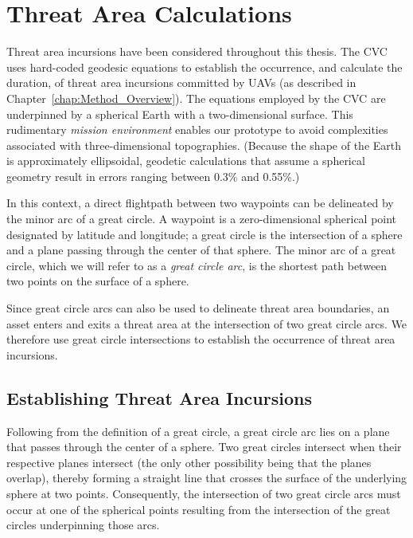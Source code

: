 \chapter{Threat Area Calculations}
\label{chap:Threat_Area_Calculations}

Threat area incursions have been considered throughout this thesis. The CVC uses hard-coded geodesic equations to establish the occurrence, and calculate the duration, of threat area incursions committed by UAVs (as described in Chapter~\ref{chap:Method_Overview}). The equations employed by the CVC are underpinned by a spherical Earth with a two-dimensional surface. This rudimentary \emph{mission environment} enables our prototype to avoid complexities associated with three-dimensional topographies. (Because the shape of the Earth is approximately ellipsoidal, geodetic calculations that assume a spherical geometry result in errors ranging between 0.3\% and 0.55\%.)

In this context, a direct flightpath between two waypoints can be delineated by the minor arc of a great circle. A waypoint is a zero-dimensional spherical point designated by latitude and longitude; a great circle is the intersection of a sphere and a plane passing through the center of that sphere. The minor arc of a great circle, which we will refer to as a \emph{great circle arc}, is the shortest path between two points on the surface of a sphere.

Since great circle arcs can also be used to delineate threat area boundaries, an asset enters and exits a threat area at the intersection of two great circle arcs. We therefore use great circle intersections to establish the occurrence of threat area incursions.

\section{Establishing Threat Area Incursions}

Following from the definition of a great circle, a great circle arc lies on a plane that passes through the center of a sphere. Two great circles intersect when their respective planes intersect (the only other possibility being that the planes overlap), thereby forming a straight line that crosses the surface of the underlying sphere at two points. Consequently, the intersection of two great circle arcs must occur at one of the spherical points resulting from the intersection of the great circles underpinning those arcs.

